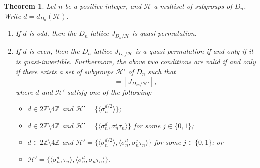 \documentclass[12pt]{amsart}
\theoremstyle{plain}
\newtheorem{thm}{Theorem}[section]
\theoremstyle{definition}
\numberwithin{thm}{section}
\numberwithin{equation}{section}
\newcommand{\Z}{\mathbb{Z}}
\newcommand{\cH}{\mathcal{H}}
\begin{document}
\begin{thm}\label{thm:dihd}
Let $n$ be a positive integer, and $\cH$ a multiset of subgroups of $D_{n}$. Write $d=d_{D_{n}}(\cH)$. 
\begin{enumerate}
\item If $d$ is odd, then the $D_{n}$-lattice $J_{D_{n}/\cH}$ is quasi-permutation. 
\item If $d$ is even, then the $D_{n}$-lattice $J_{D_{n}/\cH}$ is a quasi-permutation if and only if it is quasi-invertible. Furthermore, the above two conditions are valid if and only if there exists a set of subgroups $\cH'$ of $D_{n}$ such that
\begin{equation*}
[J_{D_{2n}/\cH}]=[J_{D_{2n}/\cH'}], 
\end{equation*}
where $d$ and $\cH'$ satisfy one of the following: 
\begin{itemize}
\item[(a)] $d\in 2\Z \setminus 4\Z$ and $\cH'=\{\langle \sigma_{n}^{d/2}\rangle\}$; 
\item[(b)] $d\in 2\Z \setminus 4\Z$ and $\cH'=\{\langle \sigma_{n}^{d},\sigma_{n}^{j}\tau_{n}\rangle\}$ for some $j\in \{0,1\}$; 
\item[(c)] $d\in 2\Z \setminus 4\Z$ and $\cH'=\{\langle \sigma_{n}^{d/2} \rangle,\langle \sigma_{n}^{d},\sigma_{n}^{j}\tau_{n} \rangle\}$ for some $j\in \{0,1\}$; or
\item[(d)] $\cH'=\{\langle \sigma_{n}^{d},\tau_{n} \rangle,\langle \sigma_{n}^{d},\sigma_{n}\tau_{n} \rangle\}$.  
\end{itemize}
\end{enumerate}
\end{thm}
\end{document}
